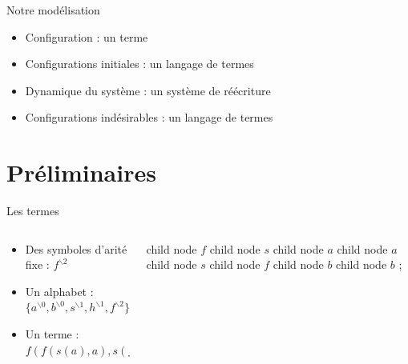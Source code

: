 \documentclass[xcolor={dvipsnames}]{beamer}
\begin{document}
\begin{frame}{Notre modélisation}
  \begin{block}{}
    \begin{itemize}[<+->]
    \item Configuration : un terme
    \item Configurations initiales : un langage de termes
    \item Dynamique du système : un système de réécriture
    \item Configurations indésirables : un langage de termes
    \end{itemize}
  \end{block}
\end{frame}

\section{Préliminaires}

\begin{frame}{Les termes}
  \begin{columns}
    \begin{column}{0.65\textwidth}
      \begin{block}{}
        \begin{itemize}[<+->]
        \item Des symboles d'arité fixe : $f^{\backslash 2}$
        \item Un alphabet : $\{ a^{\backslash 0}, b^{\backslash 0}, s^{\backslash 1}, h^{\backslash 1}, f^{\backslash 2}\}$
        \item Un terme : $f(f(s(a), a),s(f(b,b)))$
        \end{itemize}
      \end{block}
    \end{column}
    \begin{column}{0.35\textwidth}
      \begin{tikz}
          child { node {$f$}
            child { node {$s$}
              child { node {$a$} } }
            child { node {$a$} } }
          child { node {$s$}
            child {node {$f$}
              child { node {$b$} }
              child { node {$b$} } } };
      \end{tikz}
    \end{column}
  \end{columns}
\end{frame}
\end{document}
